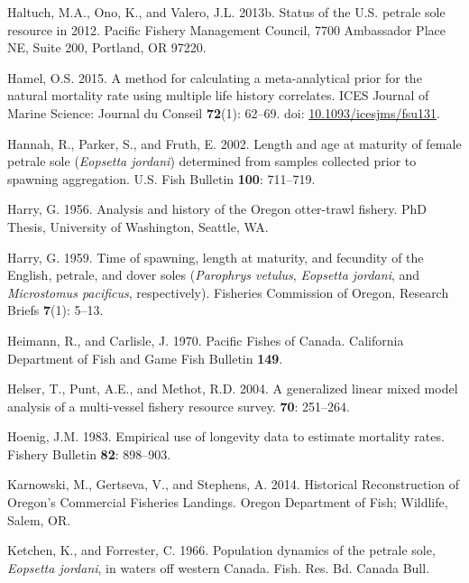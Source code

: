 \documentclass[12pt,]{article}
\begin{document}
\hypertarget{ref-haltuch_status_2013}{}
Haltuch, M.A., Ono, K., and Valero, J.L. 2013b. Status of the U.S.
petrale sole resource in 2012. Pacific Fishery Management Council, 7700
Ambassador Place NE, Suite 200, Portland, OR 97220.

\hypertarget{ref-hamel_method_2015}{}
Hamel, O.S. 2015. A method for calculating a meta-analytical prior for
the natural mortality rate using multiple life history correlates. ICES
Journal of Marine Science: Journal du Conseil \textbf{72}(1): 62--69.
doi:
\href{https://doi.org/10.1093/icesjms/fsu131}{10.1093/icesjms/fsu131}.

\hypertarget{ref-hannah_length_2002}{}
Hannah, R., Parker, S., and Fruth, E. 2002. Length and age at maturity
of female petrale sole (\emph{Eopsetta jordani}) determined from samples
collected prior to spawning aggregation. U.S. Fish Bulletin
\textbf{100}: 711--719.

\hypertarget{ref-harry_analysis_1956}{}
Harry, G. 1956. Analysis and history of the Oregon otter-trawl fishery.
PhD Thesis, University of Washington, Seattle, WA.

\hypertarget{ref-harry_time_1959}{}
Harry, G. 1959. Time of spawning, length at maturity, and fecundity of
the English, petrale, and dover soles (\emph{Parophrys vetulus},
\emph{Eopsetta jordani}, and \emph{Microstomus pacificus},
respectively). Fisheries Commission of Oregon, Research Briefs
\textbf{7}(1): 5--13.

\hypertarget{ref-heimann_pacific_1970}{}
Heimann, R., and Carlisle, J. 1970. Pacific Fishes of Canada. California
Department of Fish and Game Fish Bulletin \textbf{149}.

\hypertarget{ref-helser_generalized_2004}{}
Helser, T., Punt, A.E., and Methot, R.D. 2004. A generalized linear
mixed model analysis of a multi-vessel fishery resource survey.
\textbf{70}: 251--264.

\hypertarget{ref-hoenig_empirical_1983}{}
Hoenig, J.M. 1983. Empirical use of longevity data to estimate mortality
rates. Fishery Bulletin \textbf{82}: 898--903.

\hypertarget{ref-karnowski_historical_2014}{}
Karnowski, M., Gertseva, V., and Stephens, A. 2014. Historical
Reconstruction of Oregon's Commercial Fisheries Landings. Oregon
Department of Fish; Wildlife, Salem, OR.

\hypertarget{ref-ketchen_population_1966}{}
Ketchen, K., and Forrester, C. 1966. Population dynamics of the petrale
sole, \emph{Eopsetta jordani}, in waters off western Canada. Fish. Res.
Bd. Canada Bull.
\end{document}
